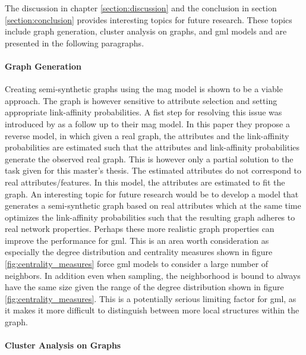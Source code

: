   The discussion in chapter \ref{section:discussion} and the conclusion in section
  \ref{section:conclusion} provides interesting topics for future research.
  These topics include graph generation, cluster analysis on graphs, and
  \acs{gml} models and are presented in the following paragraphs.
  \newpage
  \paragraph{Graph Generation} \mbox{}
  
  \noindent Creating semi-synthetic graphs using the \acs{mag} model is shown to 
  be a viable approach. The graph is however sensitive to attribute selection and 
  setting appropriate link-affinity probabilities. A fist step for resolving
  this issue was introduced by \cite{kim2011modeling} as a follow up to their
  \acs{mag} model. In this paper they propose a reverse model, in which given a real
  graph, the attributes and the link-affinity probabilities are estimated such 
  that the attributes and link-affinity probabilities generate the observed real
  graph. This is however only a partial solution to the task given for this
  master's thesis. The estimated attributes do not correspond to real 
  attributes/features. In this model, the attributes are estimated to fit the 
  graph. An interesting topic for future research would be to develop a model 
  that generates a semi-synthetic graph based on real attributes which at the same
  time optimizes the link-affinity probabilities such that the resulting graph
  adheres to real network properties. Perhaps these more realistic graph 
  properties can improve the performance for \acs{gml}. This is an area worth 
  consideration as especially the degree distribution and centrality measures 
  shown in figure \ref{fig:centrality_measures} force \acs{gml} models to 
  consider a large number of neighbors. In addition even when sampling, the 
  neighborhood is bound to always have the same size given the range of the 
  degree distribution shown in figure \ref{fig:centrality_measures}. This is a
  potentially serious limiting factor for \acs{gml}, as it makes it more difficult to 
  distinguish between more local structures within the graph.

  \paragraph{Cluster Analysis on Graphs} \mbox{}

